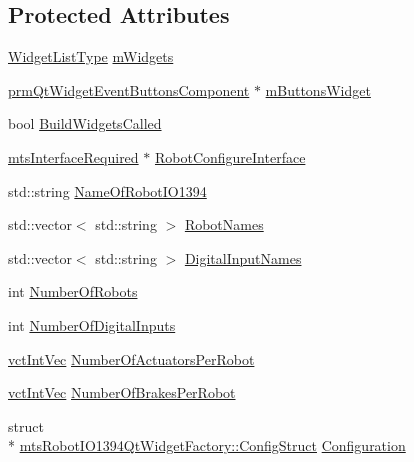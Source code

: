 \subsection*{Protected Attributes}
\begin{DoxyCompactItemize}
\item 
\hyperlink{classmts_robot_i_o1394_qt_widget_factory_aaa614e39fe48800dab4b21edf6845c22}{Widget\-List\-Type} \hyperlink{classmts_robot_i_o1394_qt_widget_factory_adaf0b9c315792eced9d1190bc3614fa8}{m\-Widgets}
\item 
\hyperlink{classprm_qt_widget_event_buttons_component}{prm\-Qt\-Widget\-Event\-Buttons\-Component} $\ast$ \hyperlink{classmts_robot_i_o1394_qt_widget_factory_a3eeee417f7939a43eeebe0d7624a5fb3}{m\-Buttons\-Widget}
\item 
bool \hyperlink{classmts_robot_i_o1394_qt_widget_factory_abc8f7a79cbc09c4f19a09654fc72fe4f}{Build\-Widgets\-Called}
\item 
\hyperlink{classmts_interface_required}{mts\-Interface\-Required} $\ast$ \hyperlink{classmts_robot_i_o1394_qt_widget_factory_a5456e298db56b3eb79c89bbbedd21846}{Robot\-Configure\-Interface}
\item 
std\-::string \hyperlink{classmts_robot_i_o1394_qt_widget_factory_a768d49c9080b3cdd9bfac4739011881e}{Name\-Of\-Robot\-I\-O1394}
\item 
std\-::vector$<$ std\-::string $>$ \hyperlink{classmts_robot_i_o1394_qt_widget_factory_ad869dbe413a4475f430975043773b5e9}{Robot\-Names}
\item 
std\-::vector$<$ std\-::string $>$ \hyperlink{classmts_robot_i_o1394_qt_widget_factory_a91c2107342e4c1ca2bdeefa374351e38}{Digital\-Input\-Names}
\item 
int \hyperlink{classmts_robot_i_o1394_qt_widget_factory_a12d58bb02a5e646dc4d901430db1753c}{Number\-Of\-Robots}
\item 
int \hyperlink{classmts_robot_i_o1394_qt_widget_factory_a76ca8abd91f3d9a0bd3aa6da7bd1deb3}{Number\-Of\-Digital\-Inputs}
\item 
\hyperlink{vct_dynamic_vector_types_8h_a47260df0b570a25352b3f318ed0b4c4e}{vct\-Int\-Vec} \hyperlink{classmts_robot_i_o1394_qt_widget_factory_a6a595f9b10a1a92194fa7619bbb08b80}{Number\-Of\-Actuators\-Per\-Robot}
\item 
\hyperlink{vct_dynamic_vector_types_8h_a47260df0b570a25352b3f318ed0b4c4e}{vct\-Int\-Vec} \hyperlink{classmts_robot_i_o1394_qt_widget_factory_a6a3a45284259fee4e32d6c2a2a1b864c}{Number\-Of\-Brakes\-Per\-Robot}
\item 
struct \\*
\hyperlink{structmts_robot_i_o1394_qt_widget_factory_1_1_config_struct}{mts\-Robot\-I\-O1394\-Qt\-Widget\-Factory\-::\-Config\-Struct} \hyperlink{classmts_robot_i_o1394_qt_widget_factory_a16b184d35dfa791f432a526a950569f9}{Configuration}
\end{DoxyCompactItemize}
